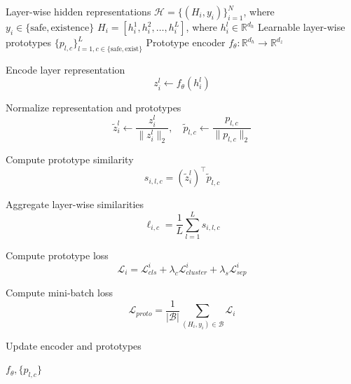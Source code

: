 \begin{algorithm}[!t]
\caption{Layer-wise Prototype Learning for Safe / Existence Concepts}
\label{alg:layerwise_prototype_learning}
\begin{algorithmic}[1]
\Require Layer-wise hidden representations $\mathcal{H}=\{(H_i, y_i)\}_{i=1}^{N}$, where $y_i \in \{\text{safe}, \text{existence}\}$
\Require $H_i = [h_i^{1}, h_i^{2}, \dots, h_i^{L}]$, where $h_i^{l}\in\mathbb{R}^{d_h}$
\Require Learnable layer-wise prototypes $\{p_{l,c}\}_{l=1,c\in\{\text{safe},\text{exist}\}}^{L}$
\Require Prototype encoder $f_\theta:\mathbb{R}^{d_h}\rightarrow\mathbb{R}^{d_z}$

                \State Encode layer representation
                \[
                    z_i^l \leftarrow f_\theta(h_i^l)
                \]

                \State Normalize representation and prototypes
                \[
                    \tilde{z}_i^l \leftarrow \frac{z_i^l}{\|z_i^l\|_2},
                    \quad
                    \tilde{p}_{l,c} \leftarrow \frac{p_{l,c}}{\|p_{l,c}\|_2}
                \]

                \State Compute prototype similarity
                \[
                    s_{i,l,c}
                    =
                    (\tilde{z}_i^l)^\top \tilde{p}_{l,c}
                \]
            \EndFor

            \State Aggregate layer-wise similarities
            \[
                \ell_{i,c}
                =
                \frac{1}{L}
                \sum_{l=1}^{L}
                s_{i,l,c}
            \]

            \State Compute prototype loss
            \[
                \mathcal{L}_{i}
                =
                \mathcal{L}_{cls}^{i}
                +
                \lambda_c \mathcal{L}_{cluster}^{i}
                +
                \lambda_s \mathcal{L}_{sep}^{i}
            \]
        \EndFor

        \State Compute mini-batch loss
        \[
            \mathcal{L}_{proto}
            =
            \frac{1}{|\mathcal{B}|}
            \sum_{(H_i,y_i)\in\mathcal{B}}
            \mathcal{L}_i
        \]

        \State Update encoder and prototypes
    \EndFor
\EndFor

\State \Return $f_\theta,\{p_{l,c}\}$
\end{algorithmic}
\end{algorithm}

